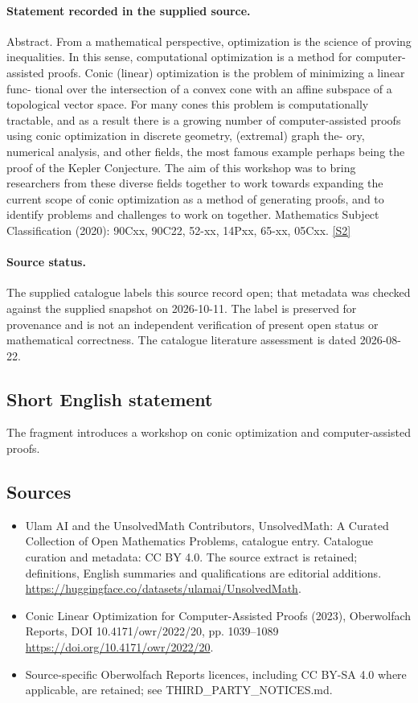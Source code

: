 \documentclass[11pt]{article}
\newcommand{\sref}[2]{\hyperlink{source:#1:#2}{[S#2]}}
\begin{document}
\paragraph{Statement recorded in the supplied source.}
Abstract. From a mathematical perspective, optimization is the science of proving inequalities. In this sense, computational optimization is a method for computer-assisted proofs. Conic (linear) optimization is the problem of minimizing a linear func- tional over the intersection of a convex cone with an affine subspace of a topological vector space. For many cones this problem is computationally tractable, and as a result there is a growing number of computer-assisted proofs using conic optimization in discrete geometry, (extremal) graph the- ory, numerical analysis, and other fields, the most famous example perhaps being the proof of the Kepler Conjecture. The aim of this workshop was to bring researchers from these diverse fields together to work towards expanding the current scope of conic optimization as a method of generating proofs, and to identify problems and challenges to work on together. Mathematics Subject Classification (2020): 90Cxx, 90C22, 52-xx, 14Pxx, 65-xx, 05Cxx. \sref{statement}{2}
\paragraph{Source status.}
The supplied catalogue labels this source record open; that metadata was checked against the supplied snapshot on 2026-10-11. The label is preserved for provenance and is not an independent verification of present open status or mathematical correctness. The catalogue literature assessment is dated 2026-08-22.
\subsection{Short English statement}
The fragment introduces a workshop on conic optimization and computer-assisted proofs.
\subsection{Sources}
\begin{itemize}
\item[\hypertarget{source:statement:1}{S1}] Ulam AI and the UnsolvedMath Contributors, UnsolvedMath: A Curated Collection of Open Mathematics Problems, catalogue entry. Catalogue curation and metadata: CC BY 4.0. The source extract is retained; definitions, English summaries and qualifications are editorial additions.
\url{https://huggingface.co/datasets/ulamai/UnsolvedMath}.
\item[\hypertarget{source:statement:2}{S2}] Conic Linear Optimization for Computer-Assisted Proofs (2023), Oberwolfach Reports, DOI 10.4171/owr/2022/20, pp. 1039--1089
\url{https://doi.org/10.4171/owr/2022/20}.
\item Source-specific Oberwolfach Reports licences, including CC BY-SA 4.0 where applicable, are retained; see THIRD\_PARTY\_NOTICES.md.
\end{itemize}
\end{document}
